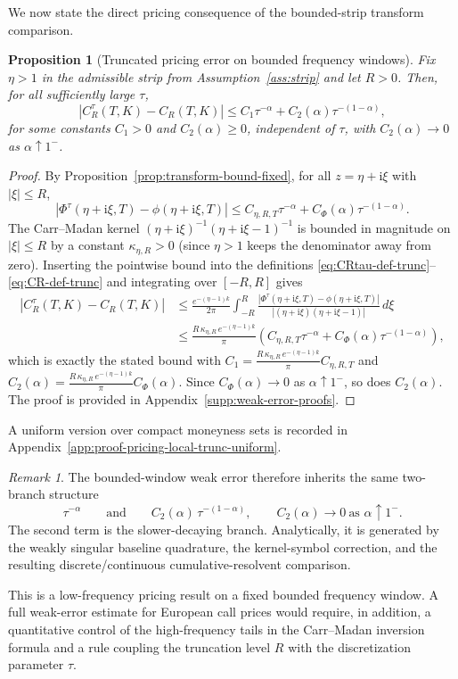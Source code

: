 \documentclass[letterpaper]{article}
\numberwithin{equation}{section}
\newtheorem{proposition}[theorem]{Proposition}
\theoremstyle{definition}
\theoremstyle{remark}
\newtheorem{remark}[theorem]{Remark}
\newcommand{\ii}{\mathrm{i}}
\begin{document}
We now state the direct pricing consequence of the bounded-strip transform
comparison.

\begin{proposition}[Truncated pricing error on bounded frequency windows]
\label{prop:pricing-local-trunc}
Fix $\eta>1$ in the admissible strip from Assumption~\ref{ass:strip} and let $R>0$.
Then, for all sufficiently large $\tau$,
\[
  \left|C_R^\tau(T,K)-C_R(T,K)\right|
  \le
  C_1\tau^{-\alpha}+C_2(\alpha)\tau^{-(1-\alpha)},
\]
for some constants $C_1>0$ and $C_2(\alpha)\ge0$, independent of $\tau$, with
$C_2(\alpha)\to0$ as $\alpha\uparrow1^-$.
\end{proposition}

\begin{proof}
{By Proposition~\ref{prop:transform-bound-fixed}, for all $z=\eta+\ii\xi$ with $|\xi|\le R$,
\[
  |\Phi^\tau(\eta+\ii\xi,T)-\phi(\eta+\ii\xi,T)|
  \le C_{\eta,R,T}\tau^{-\alpha}+C_\Phi(\alpha)\tau^{-(1-\alpha)}.
\]
The Carr--Madan kernel $(\eta+\ii\xi)^{-1}(\eta+\ii\xi-1)^{-1}$ is bounded in magnitude on $|\xi|\le R$ by a constant $\kappa_{\eta,R}>0$ (since $\eta>1$ keeps the denominator away from zero). Inserting the pointwise bound into the definitions \eqref{eq:CRtau-def-trunc}--\eqref{eq:CR-def-trunc} and integrating over $[-R,R]$ gives
\begin{align*}
  |C_R^\tau(T,K)-C_R(T,K)|
  &\le
  \frac{e^{-(\eta-1)k}}{2\pi}\int_{-R}^{R}
    \frac{|\Phi^\tau(\eta+\ii\xi,T)-\phi(\eta+\ii\xi,T)|}
         {|(\eta+\ii\xi)(\eta+\ii\xi-1)|}
  \,d\xi \\
  &\le \frac{R\,\kappa_{\eta,R}\,e^{-(\eta-1)k}}{\pi}
   \left(C_{\eta,R,T}\tau^{-\alpha}+C_\Phi(\alpha)\tau^{-(1-\alpha)}\right),
\end{align*}
which is exactly the stated bound with $C_1=\frac{R\,\kappa_{\eta,R}\,e^{-(\eta-1)k}}{\pi}C_{\eta,R,T}$ and $C_2(\alpha)=\frac{R\,\kappa_{\eta,R}\,e^{-(\eta-1)k}}{\pi}C_\Phi(\alpha)$. Since $C_\Phi(\alpha)\to0$ as $\alpha\uparrow1^-$, so does $C_2(\alpha)$.} The proof is provided in Appendix~\ref{supp:weak-error-proofs}.
\end{proof}

A uniform version over compact moneyness sets is recorded in Appendix~\ref{app:proof-pricing-local-trunc-uniform}.

\begin{remark}
The bounded-window weak error therefore inherits the same two-branch structure
\[
  \tau^{-\alpha}
  \qquad\text{and}\qquad
  C_2(\alpha)\,\tau^{-(1-\alpha)},
  \qquad C_2(\alpha)\to0\ \text{as }\alpha\uparrow1^-.
\]
The second term is the slower-decaying branch. Analytically, it is generated by the weakly singular baseline quadrature, the kernel-symbol correction, and the resulting discrete/continuous cumulative-resolvent comparison.

This is a low-frequency pricing result on a fixed bounded frequency window. A
full weak-error estimate for European call prices would require, in addition, a
quantitative control of the high-frequency tails in the Carr--Madan inversion
formula and a rule coupling the truncation level $R$ with the discretization
parameter $\tau$.
\end{remark}
\end{document}
